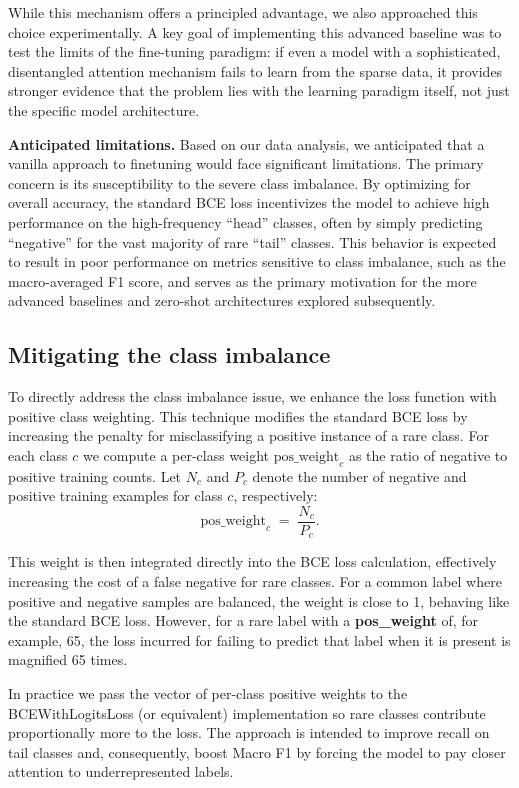 While this mechanism offers a principled advantage, we also approached this choice experimentally. A key goal of implementing this advanced baseline was to test the limits of the fine-tuning paradigm: if even a model with a sophisticated, disentangled attention mechanism fails to learn from the sparse data, it provides stronger evidence that the problem lies with the learning paradigm itself, not just the specific model architecture.

\medskip
\noindent\textbf{Anticipated limitations.} Based on our data analysis, we anticipated that a vanilla approach to finetuning would face significant limitations. The primary concern is its susceptibility to the severe class imbalance. By optimizing for overall accuracy, the standard BCE loss incentivizes the model to achieve high performance on the high-frequency ``head'' classes, often by simply predicting ``negative'' for the vast majority of rare ``tail'' classes.
This behavior is expected to result in poor performance on metrics sensitive to class imbalance, such as the macro-averaged F1 score, and serves as the primary motivation for the more advanced baselines and zero-shot architectures explored subsequently.

\subsection{Mitigating the class imbalance}
To directly address the class imbalance issue, we enhance the loss function with positive class weighting. This technique modifies the standard BCE loss by increasing the penalty for misclassifying a positive instance of a rare class. For each class $c$ we compute a per-class weight \(\mathrm{pos\_weight}_c\) as the ratio of negative to positive training counts. Let $N_c$ and $P_c$ denote the number of negative and positive training examples for class $c$, respectively:
\[
	\mathrm{pos\_weight}_c \;=\; \frac{N_c}{P_c}.
\]

This weight is then integrated directly into the BCE loss calculation, effectively increasing the cost of a false negative for rare classes. For a common label where positive and negative samples are balanced, the weight is close to 1, behaving like the standard BCE loss. However, for a rare label with a \textbf{pos\_weight} of, for example, 65, the loss incurred for failing to predict that label when it is present is magnified 65 times.

In practice we pass the vector of per-class positive weights to the BCEWithLogitsLoss (or equivalent) implementation so rare classes contribute proportionally more to the loss. The approach is intended to improve recall on tail classes and, consequently, boost Macro F1 by forcing the model to pay closer attention to underrepresented labels.

